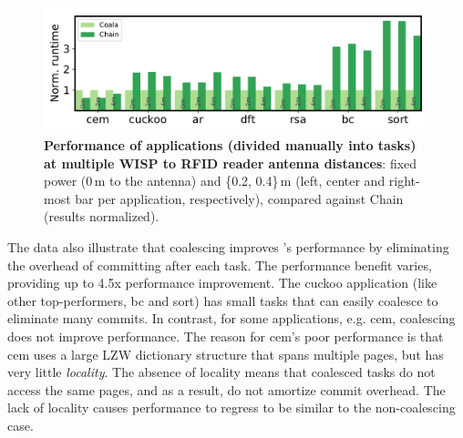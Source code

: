 \begin{figure}
	\centering
	\includegraphics[width=\columnwidth]{figures/coala_chain_clang}
	\caption{\textbf{Performance of \sys applications (divided manually into tasks) at multiple WISP to RFID reader antenna distances}: fixed power (0\,m to the antenna) and \{0.2, 0.4\}\,m (left, center and right-most bar per application, respectively), compared against Chain (results normalized).}
	\label{fig:runtime}
\end{figure}

The data also illustrate that coalescing improves \sys's performance by eliminating the overhead of committing after each task. The performance benefit varies, providing up to 4.5x performance improvement. The cuckoo application (like other top-performers, bc and sort) has small tasks that \sys can easily coalesce to eliminate many commits. In contrast, for some applications, e.g. cem, coalescing does not improve performance. The reason for cem's poor performance is that cem uses a large LZW dictionary structure that spans multiple pages, but has very little {\em locality}. The absence of locality means that coalesced tasks do not access the same pages, and as a result, do not amortize commit overhead. The lack of locality causes performance to regress to be similar to the non-coalescing case. 



